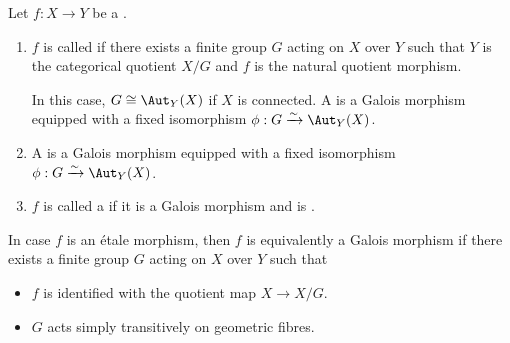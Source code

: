 \begin{definition} \label{definition:galois_morphism_of_schemes}

Let $f: X \to Y$ be a  . 
\begin{enumerate}
  \item $f$ is called  if there exists a finite group $G$ acting on $X$ over $Y$ such that $Y$ is the categorical quotient $X/G$ and $f$ is the natural quotient morphism.
  
  In this case, $G \cong \Aut_Y(X)$ if $X$ is connected. A  is a Galois morphism equipped with a fixed isomorphism $\phi: G \xrightarrow{\sim} \Aut_Y(X)$.


  \item A  is a Galois morphism equipped with a fixed isomorphism $\phi: G \xrightarrow{\sim} \Aut_Y(X)$.


  \item $f$ is called a  if it is a Galois morphism and is .
\end{enumerate}





In case $f$ is an \'etale morphism, then $f$ is equivalently a Galois morphism if there exists a finite group $G$ acting on $X$ over $Y$ such that 
\begin{itemize}
    \item $f$ is identified with the quotient map $X \to X/G$. 
    \item $G$ acts simply transitively on geometric fibres.
\end{itemize}
\end{definition}